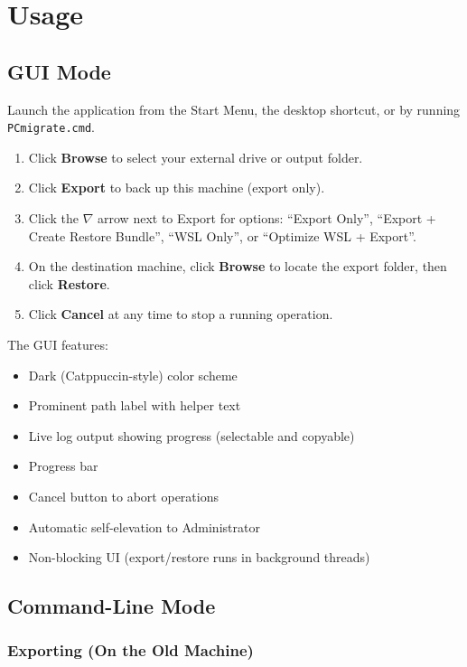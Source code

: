 \documentclass[11pt,a4paper]{article}
\begin{document}
\section{Usage}

\subsection{GUI Mode}

Launch the application from the Start Menu, the desktop shortcut, or by running \texttt{PCmigrate.cmd}.

\begin{enumerate}
    \item Click \textbf{Browse} to select your external drive or output folder.
    \item Click \textbf{Export} to back up this machine (export only).
    \item Click the \textbf{{\footnotesize$\nabla$}} arrow next to Export for options: ``Export Only'', ``Export + Create Restore Bundle'', ``WSL Only'', or ``Optimize WSL + Export''.
    \item On the destination machine, click \textbf{Browse} to locate the export folder, then click \textbf{Restore}.
    \item Click \textbf{Cancel} at any time to stop a running operation.
\end{enumerate}

The GUI features:
\begin{itemize}
    \item Dark (Catppuccin-style) color scheme
    \item Prominent path label with helper text
    \item Live log output showing progress (selectable and copyable)
    \item Progress bar
    \item Cancel button to abort operations
    \item Automatic self-elevation to Administrator
    \item Non-blocking UI (export/restore runs in background threads)
\end{itemize}

\subsection{Command-Line Mode}

\subsubsection{Exporting (On the Old Machine)}
\end{document}
